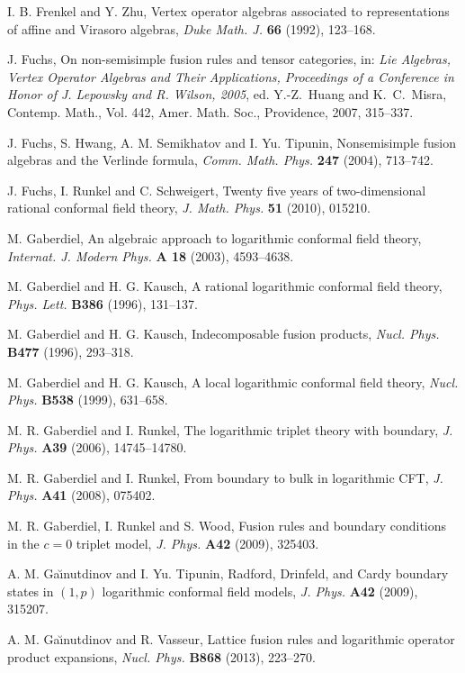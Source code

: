 \documentclass[12pt]{article}
\begin{document}
\begin{thebibliography}{FGST2}
I. B. Frenkel and Y.  Zhu, Vertex operator
algebras associated to representations of affine and Virasoro
algebras, {\em Duke Math. J.} {\bf 66} (1992),  123--168.

J. Fuchs, On non-semisimple fusion rules and tensor categories, in:
{\it Lie Algebras, Vertex Operator Algebras and Their Applications,
Proceedings of a Conference in Honor of J. Lepowsky and R. Wilson, 2005}, 
ed. Y.-Z.~Huang
and K.~C.~Misra, Contemp. Math., Vol. 442, Amer. Math. Soc., Providence,
2007, 315--337.

J. Fuchs, S. Hwang, A. M. Semikhatov and I. Yu. Tipunin, Nonsemisimple
fusion algebras and the Verlinde formula, {\it Comm. Math. Phys.} {\bf
247} (2004), 713--742.

J. Fuchs, I. Runkel and C. Schweigert, Twenty five years of 
two-dimensional rational conformal field theory, 
{\it J. Math. Phys.} {\bf 51} (2010), 015210.

 M. Gaberdiel, An algebraic approach to logarithmic
conformal field theory,  {\em
Internat. J. Modern Phys.} {\bf A 18} (2003), 4593--4638.

 M. Gaberdiel and H. G. Kausch, A rational
logarithmic conformal field theory, {\em Phys. Lett.} {\bf B386}
(1996), 131--137.

M. Gaberdiel and H. G. Kausch, Indecomposable fusion products, {\em
Nucl. Phys.} {\bf B477} (1996), 293--318.

 M. Gaberdiel and H. G. Kausch, A local logarithmic
conformal field theory, {\em Nucl. Phys.} {\bf B538} (1999), 631--658.

M. R. Gaberdiel and I. Runkel, The logarithmic triplet theory with
boundary,
{\it J. Phys.} {\bf A39} (2006), 14745--14780.

M. R. Gaberdiel and I. Runkel, From boundary to bulk in logarithmic
CFT,
{\it J. Phys.} {\bf A41} (2008), 075402.

M. R. Gaberdiel, I. Runkel and S. Wood,
Fusion rules and boundary conditions in the $c=0$ triplet model, 
{\it J. Phys.} {\bf A42} (2009), 325403.

A. M. Ga{\u\i}nutdinov and I. Yu. Tipunin, Radford, 
Drinfeld, and Cardy boundary states 
in $(1,p)$ logarithmic conformal field models,
{\it J. Phys.} {\bf A42} (2009), 315207. 

A. M. Ga{\u\i}nutdinov and R. Vasseur, Lattice fusion rules and
logarithmic operator product expansions, {\em Nucl. Phys.} {\bf B868}
(2013), 223--270.


\end{thebibliography}
\end{document}
